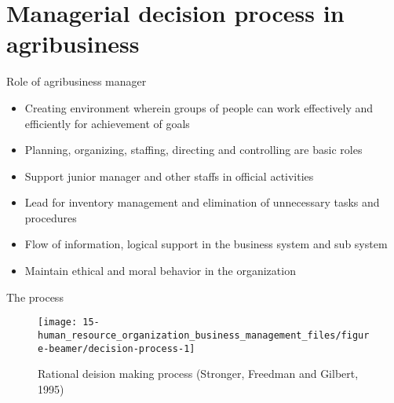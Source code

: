 \documentclass[12pt,ignorenonframetext,aspectratio=169]{beamer}
\providecommand{\tightlist}{%
  \setlength{\itemsep}{0pt}\setlength{\parskip}{0pt}}
\begin{document}
\hypertarget{managerial-decision-process-in-agribusiness}{%
\section{Managerial decision process in
agribusiness}\label{managerial-decision-process-in-agribusiness}}

\begin{frame}{Role of agribusiness manager}
\protect\hypertarget{role-of-agribusiness-manager}{}
\begin{itemize}
\tightlist
\item
  Creating environment wherein groups of people can work effectively and
  efficiently for achievement of goals
\item
  Planning, organizing, staffing, directing and controlling are basic
  roles
\item
  Support junior manager and other staffs in official activities
\item
  Lead for inventory management and elimination of unnecessary tasks and
  procedures
\item
  Flow of information, logical support in the business system and sub
  system
\item
  Maintain ethical and moral behavior in the organization
\end{itemize}
\end{frame}

\begin{frame}{The process}
\protect\hypertarget{the-process}{}
\begin{figure}
\texttt{[image: 15-human\_resource\_organization\_business\_management\_files/figure-beamer/decision-process-1]} \caption{Rational deision making process (Stronger, Freedman and Gilbert, 1995)}\label{fig:decision-process}
\end{figure}
\end{frame}
\end{document}
